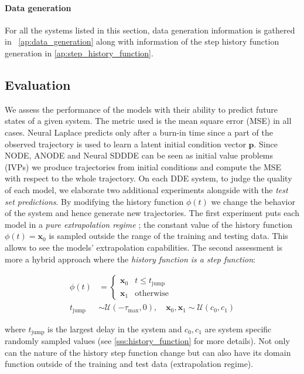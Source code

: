 \paragraph{Data generation} For all the systems listed in this section, data generation information is gathered in ~\ref{ap:data_generation} along with information of the step history function generation in \ref{ap:step_history_function}.



\subsection{Evaluation}
\label{ss:evaluation}
We assess the performance of the models with their ability to predict future states of a given system. The metric used is the mean square error (MSE) in all cases. Neural Laplace predicts only after a burn-in time
since a part of the observed trajectory is used to learn a latent initial condition vector $\mathbf{p}$. Since NODE, ANODE and Neural SDDDE can be seen as initial value problems (IVPs) we produce trajectories from initial conditions and compute the MSE with respect to the whole trajectory.
On each DDE system, to judge the quality of each model, we elaborate two additional experiments alongside with the \textit{test set predictions}. By modifying the history function $\phi(t)$ we change the behavior of the system and hence generate new trajectories. The first experiment puts each model in a \textit{pure extrapolation regime} ; the constant value of the history function $\phi(t)=\mathbf{x}_0$ is sampled outside the range of the training and testing data. This allows to see the models' extrapolation capabilities. The second assessment is more a hybrid approach where the \textit{history function is a step function}:

\begin{equation*}
\begin{aligned}
\phi(t) &= \begin{cases} 
      \mathbf{x}_0 & t\leq t_{\text{jump}} \\
      \mathbf{x}_1 & \text{otherwise}
   \end{cases} \\
t_{\text{jump}} &\sim \mathcal{U}(-\tau_{\text{max}}, 0), \quad \mathbf{x}_0, \mathbf{x}_1 \sim \mathcal{U}(c_0, c_1)
\end{aligned}
\end{equation*}

where $t_{\text{jump}}$ is the largest delay in the system and $c_0, c_1$ are system specific randomly sampled values (see \ref{sss:history_function} for more details). Not only can the nature of the history step function change but can also have its domain function outside of the training and test data (extrapolation regime).

